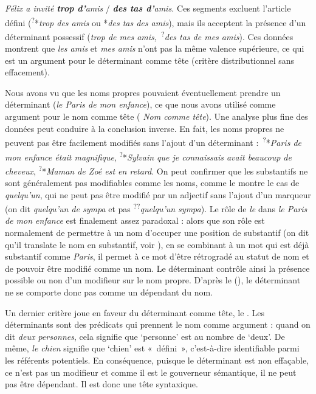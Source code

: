\ea \textit{{Félix a invité} \textbf{{trop d’}}{amis}} / \textit{\textbf{{des tas d’}}{amis.}}\z
Ces segments excluent l’article défini (\textsuperscript{?}*\textit{trop des amis} ou *\textit{des tas des amis}), mais ils acceptent la présence d’un déterminant possessif (\textit{trop de mes amis,~}\textsuperscript{?}\textit{des tas de mes amis}). Ces données montrent que \textit{les amis} et \textit{mes amis} n’ont pas la même valence supérieure, ce qui est un argument pour le déterminant comme tête (critère distributionnel sans effacement).

Nous avons vu que les noms propres pouvaient éventuellement prendre un déterminant (\textit{le Paris de mon enfance}), ce que nous avons utilisé comme argument pour le nom comme tête ( \textit{Nom comme tête}). Une analyse plus fine des données peut conduire à la conclusion inverse. En fait, les noms propres ne peuvent pas être facilement modifiés sans l’ajout d’un déterminant :~\textsuperscript{?}*\textit{Paris de mon enfance était magnifique}, \textsuperscript{?}*\textit{Sylvain que je connaissais avait beaucoup de cheveux}, \textsuperscript{?}*\textit{Maman de Zoé est en retard}. On peut confirmer que les substantifs ne sont généralement pas modifiables comme les noms, comme le montre le cas de \textit{quelqu’un}, qui ne peut pas être modifié par un adjectif sans l’ajout d’un marqueur (on dit \textit{quelqu’un de sympa} et pas \textsuperscript{??}\textit{quelqu’un sympa}). Le rôle de \textit{le} dans \textit{le Paris de mon enfance} est finalement assez paradoxal : alors que son rôle est normalement de permettre à un nom d’occuper une position de substantif (on dit qu’il translate le nom en substantif, voir ), en se combinant à un mot qui est déjà substantif comme \textit{Paris}, il permet à ce mot d’être rétrogradé au statut de nom et de pouvoir être modifié comme un nom. Le déterminant contrôle ainsi la présence possible ou non d'un modifieur sur le nom propre. D'après le  (), le déterminant ne se comporte donc pas comme un dépendant du nom.

Un dernier critère joue en faveur du déterminant comme tête, le . Les déterminants sont des prédicats qui prennent le nom comme argument : quand on dit \textit{deux personnes}, cela signifie que ‘personne’ est au nombre de ‘deux’. De même, \textit{le chien} signifie que ‘chien’ est «~défini~», c’est-à-dire identifiable parmi les référents potentiels. En conséquence, puisque le déterminant est non effaçable, ce n’est pas un modifieur et comme il est le gouverneur sémantique, il ne peut pas être dépendant. Il est donc une tête syntaxique.

